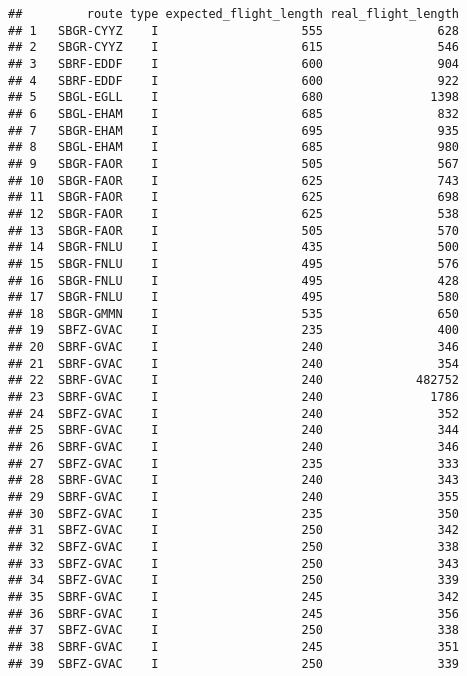 \documentclass[
]{article}
\begin{document}
\begin{verbatim}
##         route type expected_flight_length real_flight_length
## 1   SBGR-CYYZ    I                    555                628
## 2   SBGR-CYYZ    I                    615                546
## 3   SBRF-EDDF    I                    600                904
## 4   SBRF-EDDF    I                    600                922
## 5   SBGL-EGLL    I                    680               1398
## 6   SBGL-EHAM    I                    685                832
## 7   SBGR-EHAM    I                    695                935
## 8   SBGL-EHAM    I                    685                980
## 9   SBGR-FAOR    I                    505                567
## 10  SBGR-FAOR    I                    625                743
## 11  SBGR-FAOR    I                    625                698
## 12  SBGR-FAOR    I                    625                538
## 13  SBGR-FAOR    I                    505                570
## 14  SBGR-FNLU    I                    435                500
## 15  SBGR-FNLU    I                    495                576
## 16  SBGR-FNLU    I                    495                428
## 17  SBGR-FNLU    I                    495                580
## 18  SBGR-GMMN    I                    535                650
## 19  SBFZ-GVAC    I                    235                400
## 20  SBRF-GVAC    I                    240                346
## 21  SBRF-GVAC    I                    240                354
## 22  SBRF-GVAC    I                    240             482752
## 23  SBRF-GVAC    I                    240               1786
## 24  SBFZ-GVAC    I                    240                352
## 25  SBRF-GVAC    I                    240                344
## 26  SBRF-GVAC    I                    240                346
## 27  SBFZ-GVAC    I                    235                333
## 28  SBRF-GVAC    I                    240                343
## 29  SBRF-GVAC    I                    240                355
## 30  SBFZ-GVAC    I                    235                350
## 31  SBFZ-GVAC    I                    250                342
## 32  SBFZ-GVAC    I                    250                338
## 33  SBFZ-GVAC    I                    250                343
## 34  SBFZ-GVAC    I                    250                339
## 35  SBRF-GVAC    I                    245                342
## 36  SBRF-GVAC    I                    245                356
## 37  SBFZ-GVAC    I                    250                338
## 38  SBRF-GVAC    I                    245                351
## 39  SBFZ-GVAC    I                    250                339

\end{verbatim}
\end{document}
